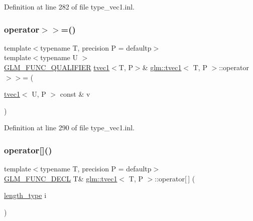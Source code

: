 Definition at line 282 of file type\+\_\+vec1.\+inl.

\mbox{\label{structglm_1_1tvec1_a7412ce02e214e4f036ce87a8f7a3f32e}} 
\subsubsection{\texorpdfstring{operator$>$$>$=()}{operator>>=()}\hspace{0.1cm}{\footnotesize\ttfamily [4/4]}}
{\footnotesize\ttfamily template$<$typename T, precision P = defaultp$>$ \\
template$<$typename U $>$ \\
\mbox{\hyperlink{setup_8hpp_a33fdea6f91c5f834105f7415e2a64407}{G\+L\+M\+\_\+\+F\+U\+N\+C\+\_\+\+Q\+U\+A\+L\+I\+F\+I\+ER}} \mbox{\hyperlink{structglm_1_1tvec1}{tvec1}}$<$T, P$>$\& \mbox{\hyperlink{structglm_1_1tvec1}{glm\+::tvec1}}$<$ T, P $>$\+::operator$>$$>$= (\begin{DoxyParamCaption}\item[{\mbox{\hyperlink{structglm_1_1tvec1}{tvec1}}$<$ U, P $>$ const \&}]{v }\end{DoxyParamCaption})}



Definition at line 290 of file type\+\_\+vec1.\+inl.

\mbox{\label{structglm_1_1tvec1_a51ab9cbe89195b12a6f12e5f7fb11636}} 
\subsubsection{\texorpdfstring{operator[]()}{operator[]()}\hspace{0.1cm}{\footnotesize\ttfamily [1/2]}}
{\footnotesize\ttfamily template$<$typename T, precision P = defaultp$>$ \\
\mbox{\hyperlink{setup_8hpp_ab2d052de21a70539923e9bcbf6e83a51}{G\+L\+M\+\_\+\+F\+U\+N\+C\+\_\+\+D\+E\+CL}} T\& \mbox{\hyperlink{structglm_1_1tvec1}{glm\+::tvec1}}$<$ T, P $>$\+::operator\mbox{[}$\,$\mbox{]} (\begin{DoxyParamCaption}\item[{\mbox{\hyperlink{structglm_1_1tvec1_ae6254cf662020a8328b744b40f419527}{length\+\_\+type}}}]{i }\end{DoxyParamCaption})}

